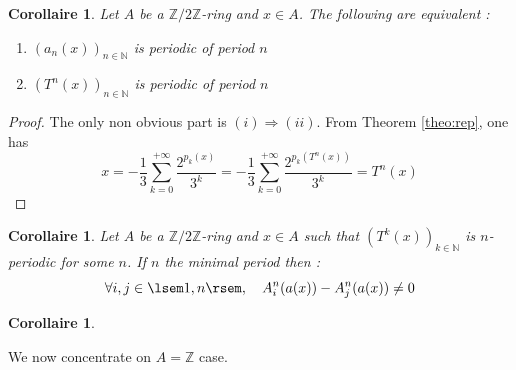 \documentclass[12pt,a4paper]{article}
\newtheorem{cor}[lem]{Corollaire}
\def\NN{\mathbb{N}}
\def\ZZ{\mathbb{Z}}
\begin{document}
\begin{cor}\label{cor:ring_following_equivalent_enumerate}Let $A$ be a $\ZZ/2\ZZ$-ring and  $x\in A$. The following are equivalent : 
\begin{enumerate}
\item  $\left(a_n(x)\right)_{n\in \NN}$ is periodic of period $n$
\item  $\left(T^n(x)\right)_{n\in \NN}$ is periodic of period $n$
\end{enumerate}
\end{cor}
\begin{proof}
 The only non obvious part is $(i)\Rightarrow (ii)$.  
 From Theorem \ref{theo:rep}, one has 
 $$ x= -\frac{1}{3}\sum_{k=0}^{+\infty} \frac{2^{p_k(x)}}{3^k} = -\frac{1}{3}\sum_{k=0}^{+\infty} \frac{2^{p_k(T^n(x))}}{3^k} = T^n(x)  $$
\end{proof}
\begin{cor}\label{cor:ring_periodic_minimal_period}  Let $A$ be a $\ZZ/2\ZZ$-ring and  $x\in A$ such that $\left(T^k(x)\right)_{k\in\NN}$ is $n$-periodic for some $n$.  If $n$ the minimal period then :
$$\forall i,j\in \lsem 1,n\rsem,\quad A_i^n(a(x))-A_j^n(a(x)) \neq 0$$
\end{cor}
\begin{cor}\label{cor:corollary}  
\end{cor}
We now concentrate on  $A=\ZZ$ case. 
\end{document}
